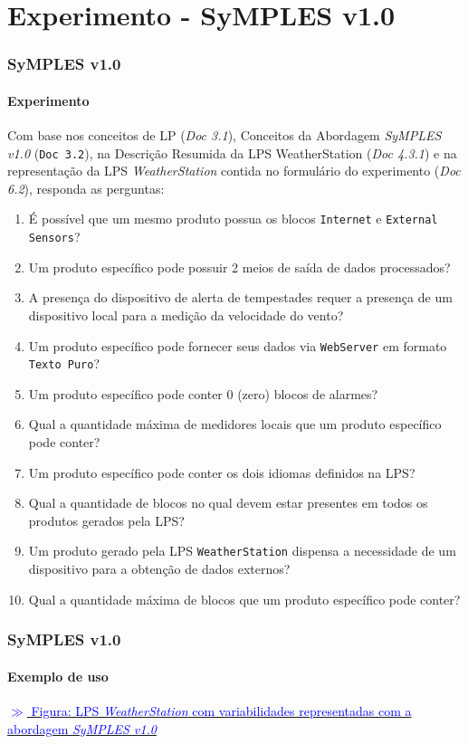 \section{Experimento - SyMPLES v1.0}

\begin{frame}[allowframebreaks]
\frametitle{SyMPLES v1.0}
\framesubtitle{Experimento}

  Com base nos conceitos de LP (\textit{Doc 3.1}), Conceitos da Abordagem \textit{SyMPLES v1.0} (\texttt{Doc 3.2}), na Descrição Resumida da LPS WeatherStation (\textit{Doc 4.3.1}) e na representação da LPS \textit{WeatherStation} contida no formulário do experimento (\textit{Doc 6.2}), responda as perguntas:
  
  \begin{enumerate}
    \item {
      É possível que um mesmo produto possua os blocos \texttt{Internet} e \texttt{External Sensors}?
    }
    \item {
      Um produto específico pode possuir 2 meios de saída de dados processados?
    }
    \item {
      A presença do dispositivo de alerta de tempestades requer a presença de um dispositivo local para a medição da velocidade do vento?
    }
    \item {
      Um produto específico pode fornecer seus dados via \texttt{WebServer} em formato \texttt{Texto Puro}?
    }
    \item {
      Um produto específico pode conter 0 (zero) blocos de alarmes?
    }
    \item {
      Qual a quantidade máxima de medidores locais que um produto específico pode conter?
    }
    \item {
      Um produto específico pode conter os dois idiomas definidos na LPS?
    }
    \item {
      Qual a quantidade de blocos no qual devem estar presentes em todos os produtos gerados pela LPS?
    }
    \item {
      Um produto gerado pela LPS \texttt{WeatherStation} dispensa a necessidade de um dispositivo para a obtenção de dados externos?
    }
    \item {
      Qual a quantidade máxima de blocos que um produto específico pode conter?
    }
  \end{enumerate}

\end{frame}

\begin{frame}
\frametitle{SyMPLES v1.0}
\framesubtitle{Exemplo de uso}

  \href{run:./material/est-met-blocks-inkscape.pdf}{\textcolor{blue}{$\gg$ Figura: LPS \textit{WeatherStation} com variabilidades representadas com a abordagem \textit{SyMPLES v1.0}}}

\end{frame}
